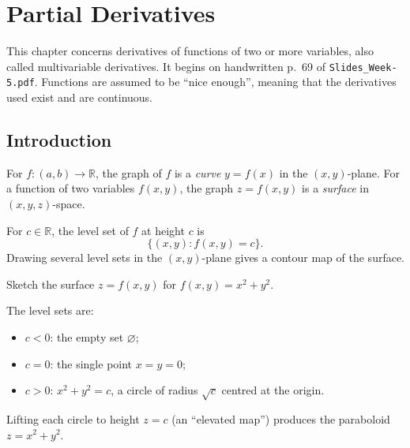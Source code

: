 \chapter{Partial Derivatives}\label{chap:partial-derivatives}

This chapter concerns derivatives of functions of two or more variables,
also called multivariable derivatives. It begins on handwritten p.~69 of
\texttt{Slides\_Week-5.pdf}. Functions are assumed to be ``nice enough'',
meaning that the derivatives used exist and are continuous.

\section{Introduction}

For $f:(a,b)\to\mathbb R$, the graph of $f$ is a \emph{curve} $y=f(x)$ in the
$(x,y)$-plane. For a function of two variables $f(x,y)$, the graph
$z=f(x,y)$ is a \emph{surface} in $(x,y,z)$-space.

\begin{definition}
For $c\in\mathbb R$, the level set of $f$ at height $c$ is
\[
 \{(x,y): f(x,y)=c\}.
\]
Drawing several level sets in the $(x,y)$-plane gives a contour map of the surface.
\end{definition}

\begin{example}
Sketch the surface $z=f(x,y)$ for $f(x,y)=x^2+y^2$.

The level sets are:
\begin{itemize}
 \item $c<0$: the empty set $\varnothing$;
 \item $c=0$: the single point $x=y=0$;
 \item $c>0$: $x^2+y^2=c$, a circle of radius $\sqrt c$ centred at the origin.
\end{itemize}
Lifting each circle to height $z=c$ (an ``elevated map'') produces the
paraboloid $z=x^2+y^2$.
\end{example}

\begin{center}
\end{center}

